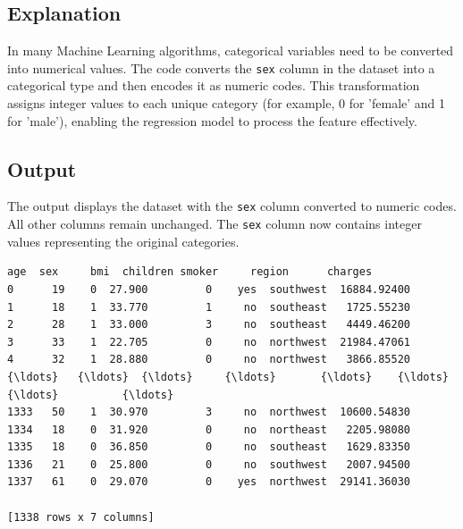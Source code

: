 \documentclass[11pt]{article}
\makeatletter
\newcommand{\boxspacing}{\kern\kvtcb@left@rule\kern\kvtcb@boxsep}
\newcommand{\prompt}[4]{
        {\ttfamily\llap{{\color{#2}[#3]:\hspace{3pt}#4}}\vspace{-\baselineskip}}
    }
\makeatother
\begin{document}
\subsection*{Explanation}
In many Machine Learning algorithms, categorical variables need to be converted into numerical values. The code converts the \texttt{sex} column in the dataset into a categorical type and then encodes it as numeric codes. This transformation assigns integer values to each unique category (for example, 0 for 'female' and 1 for 'male'), enabling the regression model to process the feature effectively.

\subsection*{Output}
The output displays the dataset with the \texttt{sex} column converted to numeric codes. All other columns remain unchanged. The \texttt{sex} column now contains integer values representing the original categories.

            \begin{tcolorbox}[breakable, size=fbox, boxrule=.5pt, pad at break*=1mm, opacityfill=0]
\prompt{Out}{outcolor}{42}{\boxspacing}
\begin{Verbatim}[commandchars=\\\{\}]
      age  sex     bmi  children smoker     region      charges
0      19    0  27.900         0    yes  southwest  16884.92400
1      18    1  33.770         1     no  southeast   1725.55230
2      28    1  33.000         3     no  southeast   4449.46200
3      33    1  22.705         0     no  northwest  21984.47061
4      32    1  28.880         0     no  northwest   3866.85520
{\ldots}   {\ldots}  {\ldots}     {\ldots}       {\ldots}    {\ldots}        {\ldots}          {\ldots}
1333   50    1  30.970         3     no  northwest  10600.54830
1334   18    0  31.920         0     no  northeast   2205.98080
1335   18    0  36.850         0     no  southeast   1629.83350
1336   21    0  25.800         0     no  southwest   2007.94500
1337   61    0  29.070         0    yes  northwest  29141.36030

[1338 rows x 7 columns]
\end{Verbatim}
\end{tcolorbox}
\end{document}
